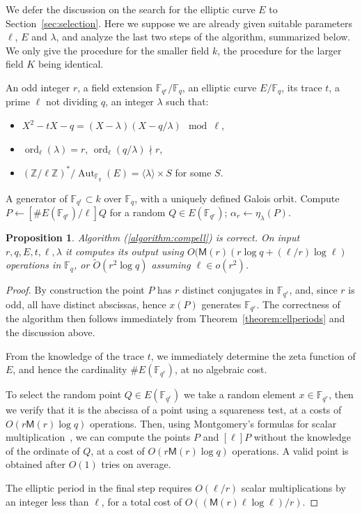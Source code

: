\documentclass[12pt]{article}
\theoremstyle{plain}
\newtheorem{proposition}[theorem]{Proposition}
\theoremstyle{definition}
\newcommand{\tildO}{\tilde{O}}
\DeclareMathOperator{\order}{ord} %
\DeclareMathOperator{\Aut}{Aut}
\def\Z{\ensuremath{\mathbb{Z}}}
\def\F{\ensuremath{\mathbb{F}}}
\def\MM{\ensuremath{\mathsf{M}}}
\newcounter{algorithm}
\begin{document}
We defer the discussion on the search for the elliptic curve $E$ to
Section~\ref{sec:selection}. Here we suppose we are already given
suitable parameters $\ell$, $E$ and $\lambda$, and analyze the last
two steps of the algorithm, summarized below.  We only give the
procedure for the smaller field $k$, the procedure for the larger
field $K$ being identical.

\begin{algorithm}
\label{algorithm:compell}
  \begin{algorithmic}[1]
    \REQUIRE An odd integer $r$, a field extension $\F_{q^r}/\F_q$,
    an elliptic curve $E/\F_q$, its trace $t$, a prime $\ell$ not dividing $q$,
    an integer $\lambda$ such that:
    \begin{itemize}
    \item $X^2 - tX - q = (X-\lambda)(X-q/\lambda) \mod\ell$,
    \item $\order_\ell(\lambda)=r$, $\order_\ell(q/\lambda)\nmid r$,
    \item $(\Z/\ell\Z)^{\ast}/\Aut_{\F_q}(E) = \langle{\lambda}\rangle \times S$ for some $S$.
    \end{itemize}
    \ENSURE A generator of $\F_{q^r}\subset k$ over $\F_q$, with a uniquely defined Galois orbit.
    \REPEAT
    \STATE Compute $P\leftarrow[\# E(\F_{q^r})/\ell]Q$ for a random $Q\in E(\F_{q^r})$;
    \RETURN $\alpha_r\leftarrow\eta_\lambda(P)$.
  \end{algorithmic}
\end{algorithm}

\begin{proposition}
  Algorithm (\ref{algorithm:compell}) is correct. On input
  $r,q,E,t,\ell,\lambda$ it computes its output using
  $O(\MM(r)(r\log{q} + (\ell/r)\log{\ell})$ operations in $\F_q$, or
  $\tildO(r^2\log q)$ assuming $\ell\in o(r^2)$.
\end{proposition}
\begin{proof}
  By construction the point $P$ has $r$ distinct conjugates in
  $\F_{q^r}$, and, since $r$ is odd, all have distinct abscissas,
  hence $x(P)$ generates $\F_{q^r}$.  The correctness of the algorithm
  then follows immediately from Theorem~\ref{theorem:ellperiods} and
  the discussion above.

  From the knowledge of the trace $t$, we immediately determine the
  zeta function of $E$, and hence the cardinality $\# E(\F_{q^r})$, at
  no algebraic cost.

  To select the random point $Q\in E(\F_{q^r})$ we take a random
  element $x\in\F_{q^r}$, then we verify that it is the abscissa of a
  point using a squareness test, at a costs of $O(r\MM(r)\log q)$
  operations. Then, using Montgomery's formulas for scalar
  multiplication~\cite{montgomery}, we can compute the points $P$ and
  $[\ell]P$ without the knowledge of the ordinate of $Q$, at a cost of
  $O(r\MM(r)\log q)$ operations. A valid point is obtained after
  $O(1)$ tries on average.

  The elliptic period in the final step requires $O(\ell/r)$ scalar
  multiplications by an integer less than $\ell$, for a total cost of
  $O((\MM(r)\ell\log\ell)/r)$.
\end{proof}
\end{document}
